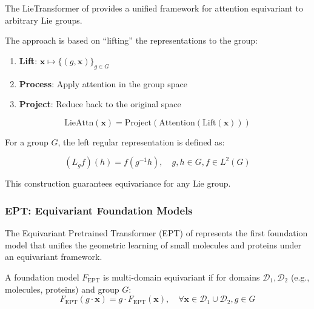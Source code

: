 The Lie\gls{Transformer} of \citet{hutchinson2020lietransformer} provides a unified framework for attention equivariant to arbitrary Lie groups.

The approach is based on ``lifting'' the representations to the group:

\begin{enumerate}
    \item \textbf{Lift}: $\mathbf{x} \mapsto \{(g, \mathbf{x})\}_{g \in G}$
    \item \textbf{Process}: Apply attention in the group space
    \item \textbf{Project}: Reduce back to the original space
\end{enumerate}

\begin{equation}
    \text{LieAttn}(\mathbf{x}) = \text{Project}(\text{Attention}(\text{Lift}(\mathbf{x})))
    \label{eq:lie_attention}
\end{equation}

For a group $G$, the left regular representation is defined as:

\begin{equation}
    (L_g f)(h) = f(g^{-1}h), \quad g, h \in G, f \in L^2(G)
    \label{eq:left_regular_representation}
\end{equation}

This construction guarantees equivariance for any Lie group.

\subsubsection{EPT: Equivariant Foundation Models}

The Equivariant Pretrained Transformer (EPT) of \citet{jiao2024ept} represents the first foundation model that unifies the geometric learning of small molecules and proteins under an equivariant framework.

\begin{definition}
    A foundation model $F_{\text{EPT}}$ is multi-domain equivariant if for domains $\mathcal{D}_1, \mathcal{D}_2$ (e.g., molecules, proteins) and group $G$:
    \begin{equation}
        F_{\text{EPT}}(g \cdot \mathbf{x}) = g \cdot F_{\text{EPT}}(\mathbf{x}), \quad \forall \mathbf{x} \in \mathcal{D}_1 \cup \mathcal{D}_2, g \in G
        \label{eq:multi_domain_equivariance}
    \end{equation}
\end{definition}

